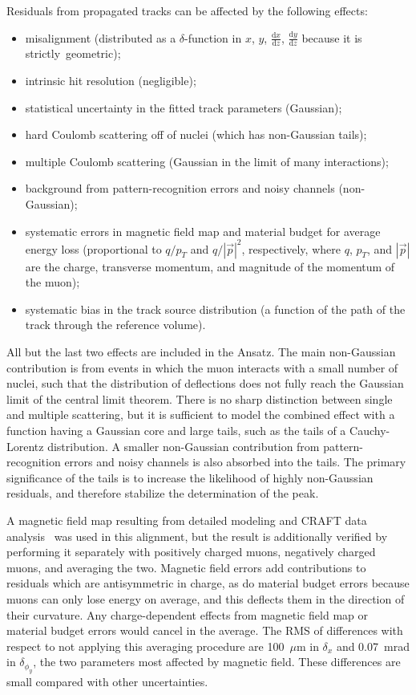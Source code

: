Residuals from propagated tracks can be affected by the following effects:
\begin{itemize}
\item misalignment (distributed as a $\delta$-function in $x$, $y$,
$\frac{\textrm{d}x}{\textrm{d}z}$, $\frac{\textrm{d}y}{\textrm{d}z}$ because it
is \mbox{strictly geometric);\hspace{-0.5 cm}}
\item intrinsic hit resolution (negligible);
\item statistical uncertainty in the fitted track parameters (Gaussian);
\item hard Coulomb scattering off of nuclei (which has non-Gaussian tails);
\item multiple Coulomb scattering (Gaussian in the limit of many interactions);
\item background from pattern-recognition errors and
noisy channels (non-Gaussian);
\item systematic errors in magnetic field map and material budget for
average energy loss (proportional to $q/p_T$ and $q/|\vec{p}|^2$,
respectively, where $q$, $p_T$, and $|\vec{p}|$ are the charge,
transverse momentum, and magnitude of the momentum of the muon);
\item systematic bias in the track source distribution (a function of
the path of the track through the reference volume).
\end{itemize}
All but the last two effects are included in the Ansatz.  The main
non-Gaussian contribution is from events in which the muon interacts
with a small number of nuclei, such that the distribution of
deflections does not fully reach the Gaussian limit of the central
limit theorem.  There is no sharp distinction between single and
multiple scattering, but it is sufficient to model the combined effect
with a function having a Gaussian core and large tails, such as the
tails of a Cauchy-Lorentz distribution.  A smaller non-Gaussian
contribution from pattern-recognition errors and noisy channels is
also absorbed into the tails.  The primary significance of the tails
is to increase the likelihood of highly non-Gaussian residuals, and
therefore stabilize the determination of the peak.

A magnetic field map resulting from detailed modeling and CRAFT data
analysis~\cite{ref:magnetic_field} was used in this alignment, but the
result is additionally verified by performing it separately with
positively charged muons, negatively charged muons, and averaging the
two.  Magnetic field errors add contributions to residuals which are
antisymmetric in charge, as do material budget errors because muons
can only lose energy on average, and this deflects them in the
direction of their curvature.  Any charge-dependent effects from
magnetic field map or material budget errors would cancel in the
average.  The RMS of differences with respect to not applying this
averaging procedure are 100~$\mu$m in $\delta_x$ and 0.07~mrad in
$\delta_{\phi_y}$, the two parameters most affected by magnetic field.
These differences are small compared with other uncertainties.

